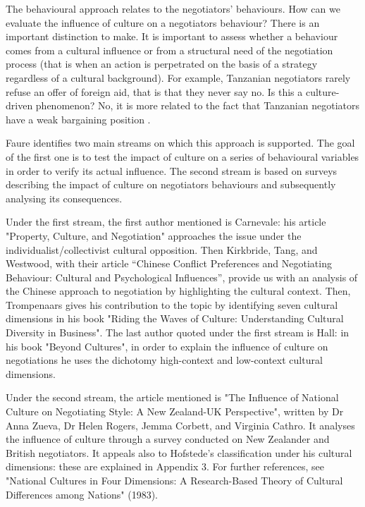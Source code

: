 \documentclass[../main.tex]{subfiles}
\begin{document}
The behavioural approach relates to the negotiators' behaviours.
How can we evaluate the influence of culture on a negotiators behaviour?
There is an important distinction to make. It is important to assess whether a behaviour comes from  a cultural influence or from a structural need of the negotiation process (that is when an action is perpetrated on the basis of a strategy regardless of a cultural background). For example, Tanzanian negotiators rarely refuse an offer of foreign aid, that is that they never say no. Is this a culture-driven phenomenon? No, it is more related to the fact that Tanzanian negotiators have a weak bargaining position \autocite[157]{elgstrom1990}. 

Faure identifies two main streams on which this approach is supported. The goal of the first one is to test the impact of culture on a series of behavioural variables in order to verify its actual influence. The second stream is based on surveys describing the impact of culture on negotiators behaviours and subsequently analysing its consequences.

Under the first stream, the first author mentioned is Carnevale: his article "Property, Culture, and Negotiation" approaches the issue under the individualist/collectivist cultural opposition. 
Then Kirkbride, Tang, and Westwood, with their article “Chinese Conflict Preferences and Negotiating Behaviour: Cultural and Psychological Influences”, provide us with an analysis of the Chinese approach to negotiation by highlighting the cultural context.
Then, Trompenaars gives his contribution to the topic by identifying seven cultural dimensions in his book "Riding the Waves of Culture: Understanding Cultural Diversity in Business". The last author quoted under the first stream is Hall: in his book "Beyond Cultures", in order to explain the influence of culture on negotiations he uses the dichotomy high-context and low-context cultural dimensions.

Under the second stream, the article mentioned is "The Influence of National Culture on Negotiating Style: A New Zealand-UK Perspective", written by Dr Anna Zueva, Dr Helen Rogers, Jemma Corbett, and Virginia Cathro. It analyses the influence of culture through a survey conducted on New Zealander and British negotiators. It appeals also to Hofstede's classification under his cultural dimensions: these are explained in Appendix 3. For further references, see "National Cultures in Four Dimensions: A Research-Based Theory of Cultural Differences among Nations" (1983).\\
\end{document}
